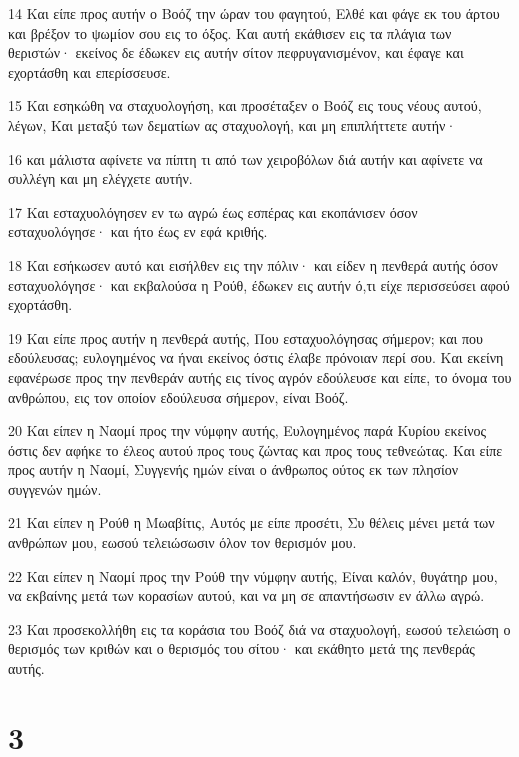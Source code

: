 \par 14 Και είπε προς αυτήν ο Βοόζ την ώραν του φαγητού, Ελθέ και φάγε εκ του άρτου και βρέξον το ψωμίον σου εις το όξος. Και αυτή εκάθισεν εις τα πλάγια των θεριστών· εκείνος δε έδωκεν εις αυτήν σίτον πεφρυγανισμένον, και έφαγε και εχορτάσθη και επερίσσευσε.
\par 15 Και εσηκώθη να σταχυολογήση, και προσέταξεν ο Βοόζ εις τους νέους αυτού, λέγων, Και μεταξύ των δεματίων ας σταχυολογή, και μη επιπλήττετε αυτήν·
\par 16 και μάλιστα αφίνετε να πίπτη τι από των χειροβόλων διά αυτήν και αφίνετε να συλλέγη και μη ελέγχετε αυτήν.
\par 17 Και εσταχυολόγησεν εν τω αγρώ έως εσπέρας και εκοπάνισεν όσον εσταχυολόγησε· και ήτο έως εν εφά κριθής.
\par 18 Και εσήκωσεν αυτό και εισήλθεν εις την πόλιν· και είδεν η πενθερά αυτής όσον εσταχυολόγησε· και εκβαλούσα η Ρούθ, έδωκεν εις αυτήν ό,τι είχε περισσεύσει αφού εχορτάσθη.
\par 19 Και είπε προς αυτήν η πενθερά αυτής, Που εσταχυολόγησας σήμερον; και που εδούλευσας; ευλογημένος να ήναι εκείνος όστις έλαβε πρόνοιαν περί σου. Και εκείνη εφανέρωσε προς την πενθεράν αυτής εις τίνος αγρόν εδούλευσε και είπε, το όνομα του ανθρώπου, εις τον οποίον εδούλευσα σήμερον, είναι Βοόζ.
\par 20 Και είπεν η Ναομί προς την νύμφην αυτής, Ευλογημένος παρά Κυρίου εκείνος όστις δεν αφήκε το έλεος αυτού προς τους ζώντας και προς τους τεθνεώτας. Και είπε προς αυτήν η Ναομί, Συγγενής ημών είναι ο άνθρωπος ούτος εκ των πλησίον συγγενών ημών.
\par 21 Και είπεν η Ρούθ η Μωαβίτις, Αυτός με είπε προσέτι, Συ θέλεις μένει μετά των ανθρώπων μου, εωσού τελειώσωσιν όλον τον θερισμόν μου.
\par 22 Και είπεν η Ναομί προς την Ρούθ την νύμφην αυτής, Είναι καλόν, θυγάτηρ μου, να εκβαίνης μετά των κορασίων αυτού, και να μη σε απαντήσωσιν εν άλλω αγρώ.
\par 23 Και προσεκολλήθη εις τα κοράσια του Βοόζ διά να σταχυολογή, εωσού τελειώση ο θερισμός των κριθών και ο θερισμός του σίτου· και εκάθητο μετά της πενθεράς αυτής.

\chapter{3}

